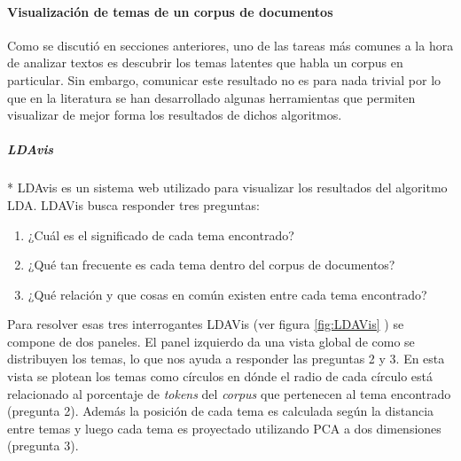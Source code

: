 \paragraph{Visualización de temas de un corpus de documentos}
    Como se discutió en secciones anteriores, uno de las tareas más comunes a la hora de analizar textos es descubrir los temas latentes que habla un corpus en particular. Sin embargo, comunicar este resultado no es para nada trivial por lo que en la literatura se han desarrollado algunas herramientas que permiten visualizar de mejor forma los resultados de dichos algoritmos.
\subparagraph{LDAvis}
\subparagraph{}*
    LDAvis \cite{sievert2014ldavis} es un sistema web utilizado para visualizar los resultados del algoritmo LDA. LDAVis  busca responder tres preguntas: 
    \begin{enumerate}
        \item ¿Cuál es el significado de cada tema encontrado?
        \item ¿Qué tan frecuente es cada tema dentro del corpus de documentos?
        \item ¿Qué relación y que cosas en común existen entre cada tema encontrado?
    \end{enumerate}
    Para resolver esas tres interrogantes LDAVis (ver figura \ref{fig:LDAVis} ) se compone de dos paneles. El panel izquierdo da una vista global de como se distribuyen los temas, lo que nos ayuda a responder las preguntas 2 y 3. En esta vista se plotean los temas como círculos en dónde el radio de cada círculo está relacionado al porcentaje de \textit{tokens} del \textit{corpus} que pertenecen al tema encontrado (pregunta 2). Además la posición de cada tema es calculada según la distancia entre temas y luego cada tema es proyectado utilizando PCA a dos dimensiones (pregunta 3). 
    
